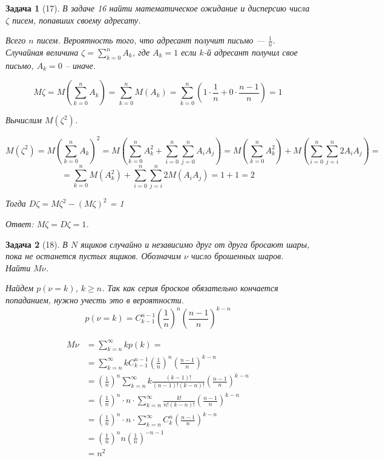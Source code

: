 \documentclass{article}
\theoremstyle{problemstyle}
\newtheorem{problem}{Задача}[section]
\begin{document}
\begin{problem}[17]
    В задаче 16 найти математическое ожидание и дисперсию числа $\zeta$
    писем, попавших своему адресату.

    Всего $n$ писем. Вероятность того, что адресант получит письмо --- $\frac{1}{n}$.
    Случайная величина $\zeta = \sum_{k=0}^n A_k$, где $A_k = 1$  если $k$-й адресант
    получил свое письмо, $A_k = 0$ -- иначе.

    \[
        M \zeta =
        M \left(\sum_{k=0}^n A_k\right) =
        \sum_{k=0}^n M (A_k) =
        \sum_{k=0}^n \left( 1 \cdot \frac{1}{n} + 0 \cdot \frac{n-1}{n} \right) =
        1
    \]

    Вычислим $M (\zeta^2)$.

    \[
        M ( \zeta^2) =
        M\left( \sum_{k=0}^n A_k \right)^2 =
        M\left( \sum_{k=0}^n A^2_k + \sum_{i = 0}^n \sum_{j=0}^n A_i A_j \right) =
        M \left( \sum_{k=0}^n A^2_k  \right) + M \left( \sum_{i = 0}^n \sum_{j=i}^n 2 A_i A_j \right) =
    \] 
    \[
        = \sum_{k=0}^n M (A^2_k)  + \sum_{i = 0}^n \sum_{j=i}^n 2 M(A_i A_j) =
        1 + 1 =
        2
    \]

    Тогда $D \zeta = M \zeta^2 - (M \zeta)^2$ = 1

    Ответ: $M \zeta = D \zeta = 1$.
\end{problem}

\begin{problem}[18]
    В $N$ ящиков случайно и независимо друг от друга бросают шары, пока
    не останется пустых ящиков. Обозначим $\nu$ число брошенных шаров.
    Найти $M \nu$.

    Найдем $p(\nu = k)$, $k \geq n$.
    Так как серия бросков обязательно кончается попаданием, нужно
    учесть это в вероятности.
    \[
        p(\nu = k) =
            C_{k-1}^{n-1}
            \left(\frac{1}{n}\right)^n
            \left(\frac{n-1}{n}\right)^{k-n}
    \]

    \begin{align*}
        M \nu &= \sum_{k=n}^\infty k p(k) = \\
              &= \sum_{k=n}^\infty k C_{k-1}^{n-1} \left(\frac{1}{n}\right)^n \left(\frac{n-1}{n}\right)^{k-n} \\
              &= \left(\frac{1}{n}\right)^n \sum_{k=n}^\infty k \frac{(k-1)!}{(n-1)! (k - n)!} \left(\frac{n-1}{n}\right)^{k-n} \\
              &= \left(\frac{1}{n}\right)^n \cdot n \cdot \sum_{k=n}^\infty \frac{k!}{n! (k-n)!} \left(\frac{n-1}{n}\right)^{k-n} \\
              &= \left(\frac{1}{n}\right)^n \cdot n \cdot \sum_{k=n}^\infty C_k^n \left(\frac{n-1}{n}\right)^{k-n} \\
              &= \left(\frac{1}{n}\right)^n n \left(\frac{1}{n}\right)^{-n-1} \\
              &= n^2
    \end{align*}

\end{problem}
\end{document}
